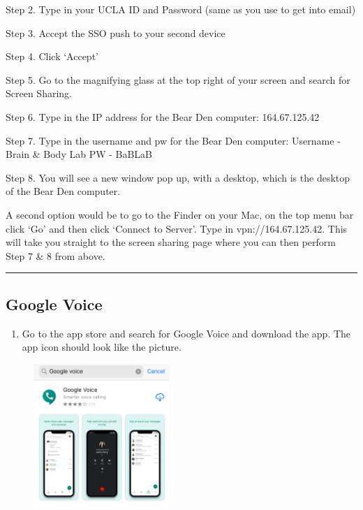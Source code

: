 \documentclass[]{book}
\providecommand{\tightlist}{%
  \setlength{\itemsep}{0pt}\setlength{\parskip}{0pt}}
\begin{document}
Step 2. Type in your UCLA ID and Password (same as you use to get into email)

Step 3. Accept the SSO push to your second device

Step 4. Click `Accept'

Step 5. Go to the magnifying glass at the top right of your screen and search for Screen Sharing.

Step 6. Type in the IP address for the Bear Den computer: 164.67.125.42

Step 7. Type in the username and pw for the Bear Den computer:
Username - Brain \& Body Lab
PW - BaBLaB

Step 8. You will see a new window pop up, with a desktop, which is the desktop of the Bear Den computer.

A second option would be to go to the Finder on your Mac, on the top menu bar click `Go' and then click `Connect to Server'. Type in vpn://164.67.125.42. This will take you straight to the screen sharing page where you can then perform Step 7 \& 8 from above.

\begin{center}\rule{0.5\linewidth}{0.5pt}\end{center}

\hypertarget{google-voice}{%
\subsection{Google Voice}\label{google-voice}}

\begin{enumerate}
\def\labelenumi{\arabic{enumi})}
\tightlist
\item
  Go to the app store and search for Google Voice and download the app. The app icon should look like the picture.
\end{enumerate}

\begin{figure}
\centering
\includegraphics{images/research_protocols/google_voice/pic1.png}
\caption{}
\end{figure}
\end{document}
